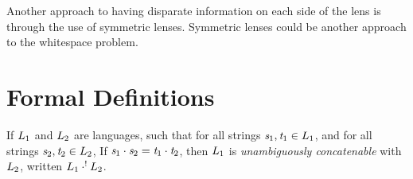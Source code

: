 \documentclass[acmsmall]{acmart}
\begin{document}
Another approach to having disparate information on each side of the lens is
through the use of symmetric lenses.  Symmetric lenses could be another approach to the
whitespace problem.

\fi


\appendix

\ifanon\else
\acks 
\fi







\ifappendices



\onecolumn
\section{Formal Definitions}
\begin{definition}
  If $L_1$ and $L_2$ are languages, such that
  for all strings $\mathit{s}_1,\mathit{t}_1 \in L_1$, and for all strings
  $\mathit{s}_2,\mathit{t}_2 \in L_2$, If $\mathit{s}_1\cdot\mathit{s}_2 =
  \mathit{t}_1\cdot\mathit{t}_2$, then $L_1$ is \textit{unambiguously
    concatenable} with $L_2$, written
  $L_1 \cdot^! L_2$.
\end{definition}
\end{document}
